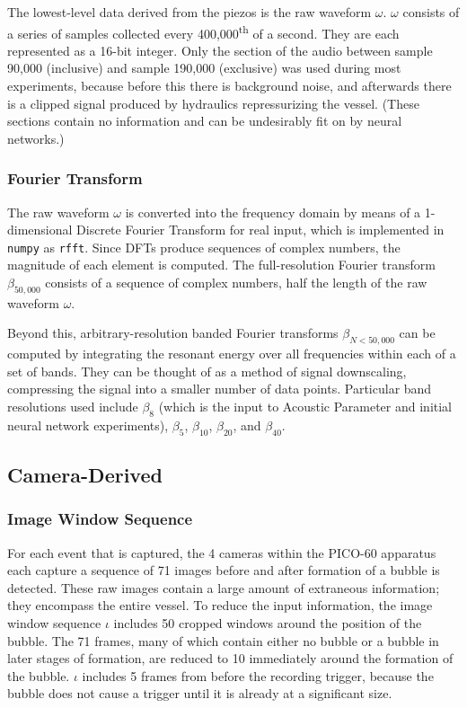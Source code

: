 \documentclass[10pt]{article}
\begin{document}
The lowest-level data derived from the piezos is the raw waveform $\omega$. $\omega$ consists of a series of samples collected every 400,000\textsuperscript{th} of a second. They are each represented as a 16-bit integer. Only the section of the audio between sample 90,000 (inclusive) and sample 190,000 (exclusive) was used during most experiments, because before this there is background noise, and afterwards there is a clipped signal produced by hydraulics repressurizing the vessel. (These sections contain no information and can be undesirably fit on by neural networks.)

\subsubsection{Fourier Transform}

The raw waveform $\omega$ is converted into the frequency domain by means of a 1-dimensional Discrete Fourier Transform for real input, which is implemented in \texttt{numpy} as \texttt{rfft}. Since DFTs produce sequences of complex numbers, the magnitude of each element is computed. The full-resolution Fourier transform $\beta _{50,000}$ consists of a sequence of complex numbers, half the length of the raw waveform $\omega$.

Beyond this, arbitrary-resolution banded Fourier transforms $\beta _{N<50,000}$ can be computed by integrating the resonant energy over all frequencies within each of a set of bands. They can be thought of as a method of signal downscaling, compressing the signal into a smaller number of data points. Particular band resolutions used include $\beta _{8}$ (which is the input to Acoustic Parameter and initial neural network experiments), $\beta _{5}$, $\beta _{10}$, $\beta _{20}$, and $\beta _{40}$.

\subsection{Camera-Derived}

\subsubsection{Image Window Sequence}

For each event that is captured, the 4 cameras within the PICO-60 apparatus each capture a sequence of 71 images before and after formation of a bubble is detected. These raw images contain a large amount of extraneous information; they encompass the entire vessel. To reduce the input information, the image window sequence $\iota$ includes 50 cropped windows around the position of the bubble. The 71 frames, many of which contain either no bubble or a bubble in later stages of formation, are reduced to 10 immediately around the formation of the bubble. $\iota$ includes 5 frames from before the recording trigger, because the bubble does not cause a trigger until it is already at a significant size.
\end{document}
